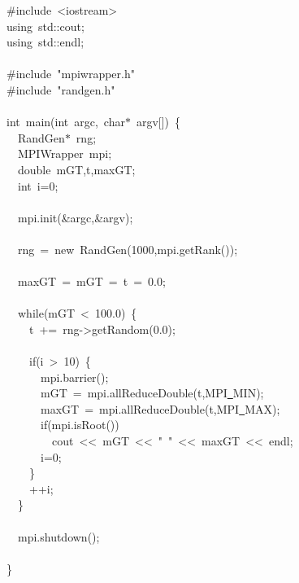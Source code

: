 {\ttfamily \raggedright \small
\#include\ <{}iostream>{}\\
using\ std::cout;\\
using\ std::endl;\\
\ \\
\#include\ "{}mpiwrapper.h"{}\\
\#include\ "{}randgen.h"{}\\
\ \\
int\ main(int\ argc,\ char$\ast$\ argv[])\ \{\\
\ \ RandGen$\ast$\ rng;\\
\ \ MPIWrapper\ mpi;\\
\ \ double\ mGT,t,maxGT;\\
\ \ int\ i=0;\\
\ \ \\
\ \ mpi.init(\&argc,\&argv);\\
\ \ \\
\ \ rng\ =\ new\ RandGen(1000,mpi.getRank());\\
\ \ \\
\ \ maxGT\ =\ mGT\ =\ t\ =\ 0.0;\\
\ \ \\
\ \ while(mGT\ <{}\ 100.0)\ \{\\
\ \ \ \ t\ +=\ rng-{}>{}getRandom(0.0);\\
\ \ \ \ \\
\ \ \ \ if(i\ >{}\ 10)\ \{\\
\ \ \ \ \ \ mpi.barrier();\\
\ \ \ \ \ \ mGT\ =\ mpi.allReduceDouble(t,MPI\underline\ MIN);\\
\ \ \ \ \ \ maxGT\ =\ mpi.allReduceDouble(t,MPI\underline\ MAX);\\
\ \ \ \ \ \ if(mpi.isRoot())\\
\ \ \ \ \ \ \ \ cout\ <{}<{}\ mGT\ <{}<{}\ "{}\ "{}\ <{}<{}\ maxGT\ <{}<{}\ endl;\\
\ \ \ \ \ \ i=0;\\
\ \ \ \ \}\\
\ \ \ \ ++i;\\
\ \ \}\\
\ \\
\ \ mpi.shutdown();\\
\ \\
\}\\
\ \\
 }
\normalfont\normalsize

